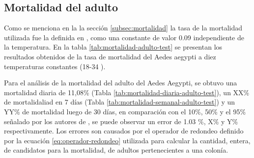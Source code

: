 \subsection{Mortalidad del adulto}
Como se menciona en la la sección \ref{subsec:mortalidad} la tasa de la mortalidad utilizada fue la definida
en \cite{otero2006stochastic}, como una constante de valor 0.09 independiente de la temperatura. En la 
tabla \ref{tab:mortalidad-adulto-test} se presentan los resultados obtenidos de la tasa de mortalidad del Aedes aegypti a diez temperaturas constantes (18-34 \textcelsius).

Para el análisis de la mortalidad del adulto del Aedes Aegypti, se obtuvo una mortalidad diaria de 11,08\% 
(Tabla \ref{tab:mortalidad-diaria-adulto-test}), un  XX\% de mortalidaliad en 7 días (Tabla 
\ref{tab:mortalidad-semanal-adulto-test}) y un YY\% de mortalidad luego de 30 días, en comparación con el 10\%, 
50\% y el 95\% señalado por los autores de \cite{ThironIzcazaJ2003}, se puede observar un error de 1.03 \%, 
X\% y Y\%  respectivamente. Los errores son causados por el operador de redondeo definido por la ecuación 
\eqref{eq:operador-redondeo} utilizada para calcular la cantidad, entera, de candidatos para la mortalidad, de adultos pertenecientes a una colonía.


